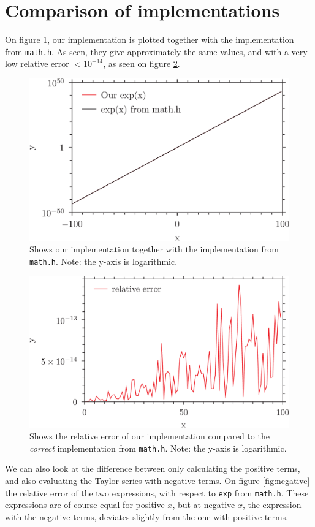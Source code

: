 \documentclass{article}
\begin{document}
\section{Comparison of implementations}
On figure \ref{fig:1}, our implementation is plotted together with the implementation from \texttt{math.h}. As seen, they give approximately the same values, and with a very low relative error $<10^{-14}$, as seen on figure \ref{fig:relative}.
\begin{figure}[h]
	\centering
	\includegraphics{plot1.png}
	\caption{Shows our implementation together with the implementation from \texttt{math.h}. Note: the y-axis is logarithmic.}
	\label{fig:1}
\end{figure}
\begin{figure}[h]
	\includegraphics{plot2.png}
	\caption{Shows the relative error of our implementation compared to the \textit{correct} implementation from \texttt{math.h}. Note: the y-axis is logarithmic.}
	\label{fig:relative}
\end{figure}
We can also look at the difference between only calculating the positive terms, and also evaluating the Taylor series with negative terms. On figure \ref{fig:negative} the relative error of the two expressions, with respect to \texttt{exp} from \texttt{math.h}. These expressions are of course equal for positive $ x $, but at negative $ x $, the expression with the negative terms, deviates slightly from the one with positive terms.
\end{document}
